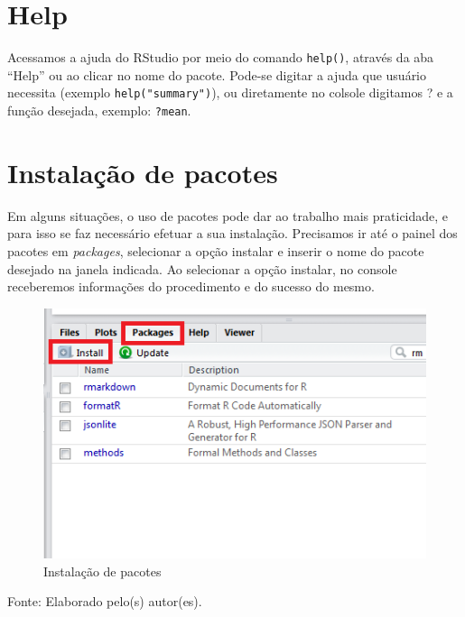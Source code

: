\documentclass[12pt,brazil,oneside]{book}
\begin{document}
\hypertarget{help}{%
\section{Help}\label{help}}

Acessamos a ajuda do RStudio por meio do comando \texttt{help()}, através da aba ``Help'' ou ao clicar no nome do pacote. Pode-se digitar a ajuda que usuário necessita (exemplo \texttt{help("summary")}), ou diretamente no colsole digitamos ? e a função desejada, exemplo: \texttt{?mean}.

\hypertarget{instalacao-de-pacotes}{%
\section{Instalação de pacotes}\label{instalacao-de-pacotes}}

Em alguns situações, o uso de pacotes pode dar ao trabalho mais praticidade, e para isso se faz necessário efetuar a sua instalação. Precisamos ir até o painel dos pacotes em \emph{packages}, selecionar a opção instalar e inserir o nome do pacote desejado na janela indicada. Ao selecionar a opção instalar, no console receberemos informações do procedimento e do sucesso do mesmo.

\begin{figure}[H]

{\centering \includegraphics[width=0.8\linewidth]{pacotes1} 

}

\caption{Instalação de pacotes}\label{fig:pacotes1}
\end{figure}

Fonte: Elaborado pelo(s) autor(es).
\end{document}
